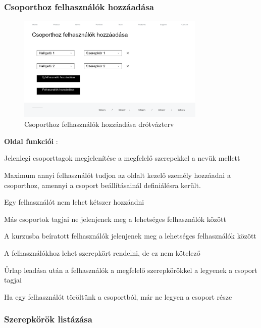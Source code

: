 \subsubsection{Csoporthoz felhasználók hozzáadása}

\begin{figure}[H]
	\centering
	\includegraphics[width=0.8\textwidth]{images/felhasznalok_hozzaadasa_wire.png}
	\caption{Csoporthoz felhasználók hozzáadása drótvázterv}
\end{figure}

\textbf{Oldal funkciói} :

\begin{compactitem}
	\item Jelenlegi csoporttagok megjelenítése a megfelelő szerepekkel a nevük mellett
    \item Maximum annyi felhasználót tudjon az oldalt kezelő személy hozzáadni a csoporthoz, amennyi a csoport beállításainál definiálésra került.
    \item Egy felhasználót nem lehet kétszer hozzáadni
    \item Más csoportok tagjai ne jelenjenek meg a lehetséges felhasználók között
    \item A kurzusba beíratott felhasználók jelenjenek meg a lehetséges felhasználók között
    \item A felhasználókhoz lehet szerepkört rendelni, de ez nem kötelező
    \item Űrlap leadása után a felhasználók a megfelelő szerepkörökkel a legyenek a csoport tagjai
    \item Ha egy felhasználót töröltünk a csoportból, már ne legyen a csoport része
    \
 \end{compactitem}

\subsubsection{Szerepkörök listázása}

